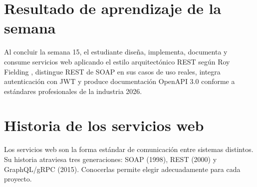 \documentclass[11pt,a4paper,openany]{book}
\begin{document}
\section*{Resultado de aprendizaje de la semana}
Al concluir la semana 15, el estudiante diseña, implementa, documenta
y consume servicios web aplicando el estilo arquitectónico REST según
Roy Fielding \cite{fielding2000rest}, distingue REST de SOAP en sus
casos de uso reales, integra autenticación con JWT y produce
documentación OpenAPI 3.0 conforme a estándares profesionales de la
industria 2026.

\section{Historia de los servicios web}

Los servicios web son la forma estándar de comunicación
entre sistemas distintos. Su historia atraviesa tres generaciones:
SOAP (1998), REST (2000) y GraphQL/gRPC (2015). Conocerlas permite
elegir adecuadamente para cada proyecto.
\end{document}

